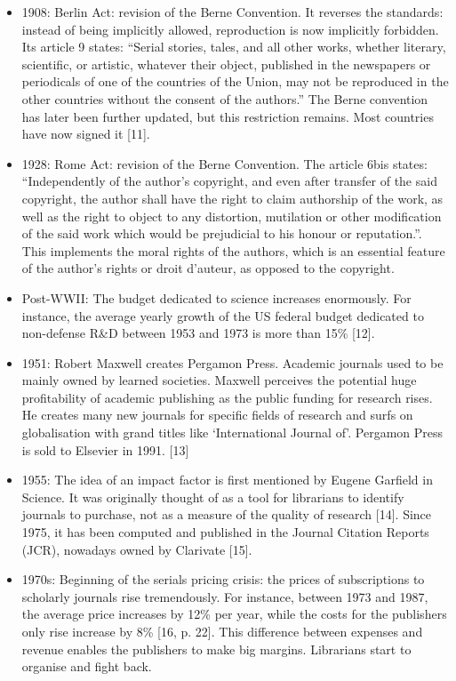 \documentclass[10pt,compress,serif]{beamer}
\begin{document}
\begin{frame}[t]
\begin{itemize}
 \item 1908: Berlin Act: revision of the Berne Convention. It reverses the standards: instead of being implicitly allowed, reproduction is now implicitly forbidden. Its article 9 states: “Serial stories, tales, and all other works, whether literary, scientific, or artistic, whatever their object, published in the newspapers or periodicals of one of the countries of the Union, may not be reproduced in the other countries without the consent of the authors.” The Berne convention has later been further updated, but this restriction remains. Most countries have now signed it [11].
 \item 1928: Rome Act: revision of the Berne Convention. The article 6bis states: “Independently of the author’s copyright, and even after transfer of the said copyright, the author shall have the right to claim authorship of the work, as well as the right to object to any distortion, mutilation or other modification of the said work which would be prejudicial to his honour or reputation.”. This implements the moral rights of the authors, which is an essential feature of the author’s rights or droit d’auteur, as opposed to the copyright.
 \item Post-WWII: The budget dedicated to science increases enormously. For instance, the average yearly growth of the US federal budget dedicated to non-defense R\&D between 1953 and 1973 is more than 15\% [12].
 \item 1951: Robert Maxwell creates Pergamon Press. Academic journals used to be mainly owned by learned societies. Maxwell perceives the potential huge profitability of academic publishing as the public funding for research rises. He creates many new journals for specific fields of research and surfs on globalisation with grand titles like ‘International Journal of’. Pergamon Press is sold to Elsevier in 1991. [13]
 \item 1955: The idea of an impact factor is first mentioned by Eugene Garfield in Science. It was originally thought of as a tool for librarians to identify journals to purchase, not as a measure of the quality of research [14]. Since 1975, it has been computed and published in the Journal Citation Reports (JCR), nowadays owned by Clarivate [15].
 \item 1970s: Beginning of the serials pricing crisis: the prices of subscriptions to scholarly journals rise tremendously. For instance, between 1973 and 1987, the average price increases by 12\% per year, while the costs for the publishers only rise increase by 8\% [16, p. 22]. This difference between expenses and revenue enables the publishers to make big margins. Librarians start to organise and fight back.

\end{itemize}
\end{frame}
\end{document}
